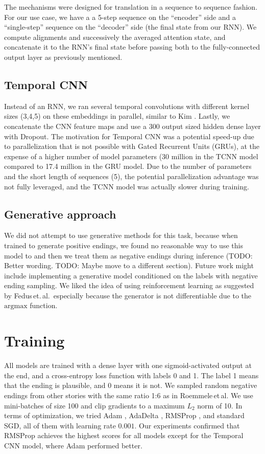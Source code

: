 \documentclass{article}
\begin{document}
The mechanisms were designed for translation in a sequence to sequence fashion. For our use case, we have a a 5-step sequence on the ``encoder'' side and a ``single-step'' sequence on the ``decoder'' side (the final state from our RNN). We compute alignments and successively the averaged attention state, and concatenate it to the RNN's final state before passing both to the fully-connected output layer as previously mentioned.

\subsection{Temporal CNN}
Instead of an RNN, we ran several temporal convolutions with different kernel sizes (3,4,5) on these embeddings in parallel, similar to Kim \citep{Kim2014ConvolutionalClassification}. Lastly, we concatenate the CNN feature maps and use a 300 output sized hidden dense layer with Dropout. The motivation for Temporal CNN was a potential speed-up due to parallelization that is not possible with Gated Recurrent Units (GRUs), at the expense of a higher number of model parameters (30 million in the TCNN model compared to 17.4 million in the GRU model. Due to the number of parameters and the short length of sequences (5), the potential parallelization advantage was not fully leveraged, and the TCNN model was actually slower during training.

\subsection{Generative approach}
We did not attempt to use generative methods for this task, because when trained to generate positive endings, we found no reasonable way to use this model to  and then we treat them as negative endings during inference (TODO: Better wording. TODO: Maybe move to a different section). Future work might include implementing a generative model conditioned on the labels with negative ending sampling. We liked the idea of using reinforcement learning as suggested by Fedus\,et.\,al.\,\citep{Fedus2018MaskGAN:_______} especially because the generator is not differentiable due to the $\mathrm{argmax}$ function.


\section{Training}\label{sec:training}
All models are trained with a dense layer with one sigmoid-activated output at the end, and a cross-entropy loss function with labels 0 and 1. The label 1 means that the ending is plausible, and 0 means it is not. We sampled random negative endings from other stories with the same ratio 1:6 as in Roemmele\,et\,al. We use mini-batches of size 100 and clip gradients to a maximum $L_2$ norm of 10. In terms of optimization, we tried Adam \citep{Kingma2015}, AdaDelta \citep{Zeiler2012ADADELTA:Method}, RMSProp \citep{HintonNeuralDescent}, and standard SGD, all of them with learning rate $0.001$. Our experiments confirmed that RMSProp \citep{HintonNeuralDescent} achieves the highest scores for all models except for the Temporal CNN model, where Adam performed better.
\end{document}
